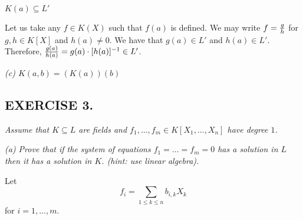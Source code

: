 \documentclass{article}
\begin{document}

$K(a)\subseteq L'$

Let us take any $f\in K(X)$ such that $f(a)$ is defined. We may write $f={g\over h}$ for $g,h\in K[X]$ and $h(a)\neq 0$. We have that $g(a)\in L'$ and $h(a)\in L'$. Therefore, ${g(a)\over h(a)}=g(a)\cdot[h(a)]^{-1}\in L'$.
\smallskip

\emph{\color{pink}(c) $K(a, b)=(K(a))(b)$}
\smallskip



\subsection*{EXERCISE 3.}
\emph{Assume that $K\subseteq L$ are fields and $f_1,...,f_m\in K[X_1,...,X_n]$ have degree $1$.}

\emph{(a) Prove that if the system of equations $f_1=...=f_m=0$ has a solution in $L$ then it has a solution in $K$. (hint: use linear algebra).}
\smallskip

Let
$$f_i=\sum\limits_{1\leq k\leq n}b_{i, k}X_k$$
for $i=1,...,m$.




\end{document}
